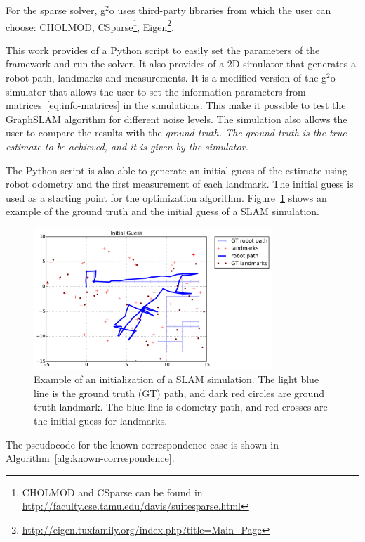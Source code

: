 For the sparse solver, g$^2$o uses third-party libraries from which the user can choose: CHOLMOD, CSparse\footnote{CHOLMOD and CSparse can be found in \url{http://faculty.cse.tamu.edu/davis/suitesparse.html}}, Eigen\footnote{\url{http://eigen.tuxfamily.org/index.php?title=Main_Page}}. 

This work provides of a Python script to easily set the parameters of the framework and run the solver. It also provides of a 2D simulator that generates a robot path, landmarks and measurements. It is a modified version of the g$^2$o simulator that allows the user to set the information parameters from matrices~\eqref{eq:info-matrices} in the simulations. This make it possible to test the GraphSLAM algorithm for different noise levels. The simulation also allows the user to compare the results with the \it{ground truth}. The ground truth is the true estimate to be achieved, and it is given by the simulator. 

The Python script is also able to generate an initial guess of the estimate using robot odometry and the first measurement of each landmark. The initial guess is used as a starting point for the optimization algorithm. Figure~\ref{fig:simulation} shows an example of the ground truth and the initial guess of a SLAM simulation.

\begin{figure}[htbp!]
    \centering
    \includegraphics[width=0.8\textwidth]{imagenes/guess_op_100_oa_100_lp_100_ds_100.pdf}
    \caption[Example of an initialization of a SLAM simulation.]{Example of an initialization of a SLAM simulation. The light blue line is the ground truth (GT) path, and dark red circles are ground truth landmark. The blue line is odometry path, and red crosses are the initial guess for landmarks.}
    \label{fig:simulation}
\end{figure}

The pseudocode for the known correspondence case is shown in Algorithm~\ref{alg:known-correspondence}.

